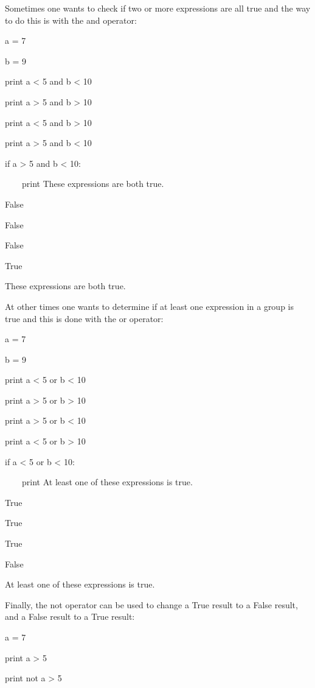 \documentclass[12pt,oneside]{book}
\begin{document}
Sometimes one wants to check if two or more expressions are all true and the way to do this is with the and operator: 

a = 7

b = 9

print a {\textless} 5 and b {\textless} 10

print a {\textgreater} 5 and b {\textgreater} 10

print a {\textless} 5 and b {\textgreater} 10

print a {\textgreater} 5 and b {\textless} 10

if a {\textgreater} 5 and b {\textless} 10:

\ \ \ \ print {\textquotedbl}These expressions are both
true.{\textquotedbl}

{\textbar}

False

False

False

True

These expressions are both true.


At other times one wants to determine if at least one expression in a group is true and this is done with the or operator: 

a = 7

b = 9

print a {\textless} 5 or b {\textless} 10

print a {\textgreater} 5 or b {\textgreater} 10

print a {\textgreater} 5 or b {\textless} 10

print a {\textless} 5 or b {\textgreater} 10


if a {\textless} 5 or b {\textless} 10:

\ \ \ \ print {\textquotedbl}At least one of these expressions is
true.{\textquotedbl}

{\textbar}

True

True

True

False

At least one of these expressions is true.

Finally, the not operator can be used to change a True result to a False result, and a False result to a True result: 

a = 7

print a {\textgreater} 5

print not a {\textgreater} 5

{\textbar}
\end{document}
